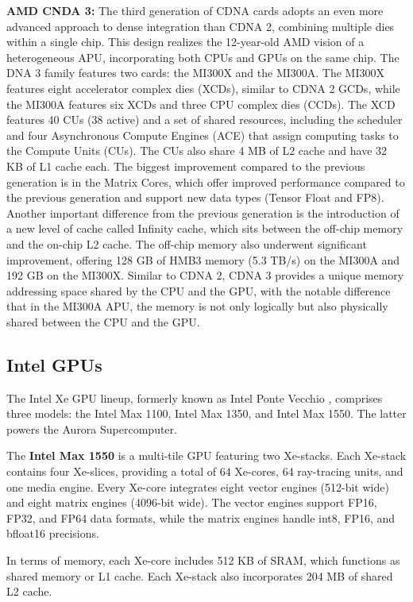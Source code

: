 \textbf{AMD CNDA 3:} The third generation of CDNA cards adopts an even more advanced approach to dense integration than CDNA 2, combining multiple dies within a single chip. This design realizes the 12-year-old AMD vision of a heterogeneous APU\cite{Smith2024}, incorporating both CPUs and GPUs on the same chip. The  DNA 3 family features two cards: the MI300X and the MI300A. The MI300X features eight accelerator complex dies (XCDs), similar to CDNA 2 GCDs, while the MI300A features six XCDs and three CPU complex dies (CCDs). 
The XCD features 40 CUs (38 active) and a set of shared resources, including the scheduler and four Asynchronous Compute Engines (ACE) that assign computing tasks to the Compute Units (CUs). The CUs also share 4 MB of L2 cache and have 32 KB of L1 cache each.
The biggest improvement compared to the previous generation is in the Matrix Cores, which offer improved performance compared to the previous generation and support new data types (Tensor Float and FP8).
Another important difference from the previous generation is the introduction of a new level of cache called Infinity cache, which sits between the off-chip memory and the on-chip L2 cache. The off-chip memory also underwent significant improvement, offering 128 GB of HMB3 memory (5.3 TB/s) on the MI300A and 192 GB on the MI300X. Similar to CDNA 2, CDNA 3 provides a unique memory addressing space shared by the CPU and the GPU, with the notable difference that in the MI300A APU, the memory is not only logically but also physically shared between the CPU and the GPU.

\subsection{Intel GPUs}

The Intel Xe GPU lineup, formerly known as Intel Ponte Vecchio \cite{gomes2022ponte}, comprises three models: the Intel Max 1100, Intel Max 1350, and Intel Max 1550. The latter powers the Aurora Supercomputer.

The \textbf{Intel Max 1550} is a multi-tile GPU featuring two Xe-stacks. Each Xe-stack contains four Xe-slices, providing a total of 64 Xe-cores, 64 ray-tracing units, and one media engine. Every Xe-core integrates eight vector engines (512-bit wide) and eight matrix engines (4096-bit wide). The vector engines support FP16, FP32, and FP64 data formats, while the matrix engines handle int8, FP16, and bfloat16 precisions.

In terms of memory, each Xe-core includes 512 KB of SRAM, which functions as shared memory or L1 cache. Each Xe-stack also incorporates 204 MB of shared L2 cache.

